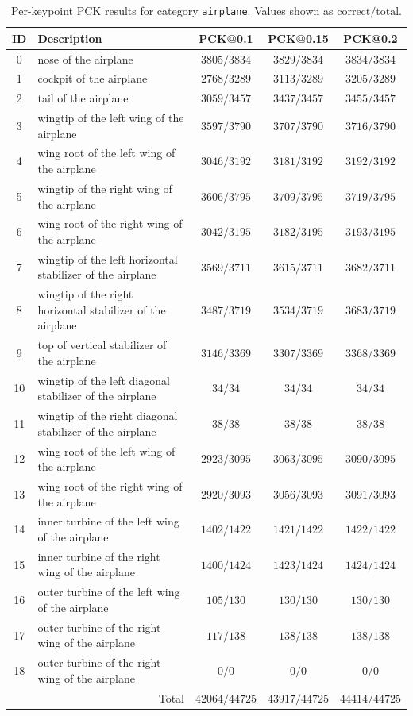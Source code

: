 \begin{table}[h]
\centering
\small
\caption{Per-keypoint PCK results for category \texttt{airplane}. Values shown as $\text{correct}/\text{total}$.}
\label{tab:pck_airplane}
\begin{tabular}{cl ccc}
\toprule
ID & Description & PCK@0.1 & PCK@0.15 & PCK@0.2 \\
\midrule
0 & nose of the airplane & $3805/3834$ & $3829/3834$ & $3834/3834$ \\
1 & cockpit of the airplane & $2768/3289$ & $3113/3289$ & $3205/3289$ \\
2 & tail of the airplane & $3059/3457$ & $3437/3457$ & $3455/3457$ \\
3 & wingtip of the left wing of the airplane & $3597/3790$ & $3707/3790$ & $3716/3790$ \\
4 & wing root of the left wing of the airplane & $3046/3192$ & $3181/3192$ & $3192/3192$ \\
5 & wingtip of the right wing of the airplane & $3606/3795$ & $3709/3795$ & $3719/3795$ \\
6 & wing root of the right wing of the airplane & $3042/3195$ & $3182/3195$ & $3193/3195$ \\
7 & wingtip of the left horizontal stabilizer of the airplane & $3569/3711$ & $3615/3711$ & $3682/3711$ \\
8 & wingtip of the right horizontal stabilizer of the airplane & $3487/3719$ & $3534/3719$ & $3683/3719$ \\
9 & top of vertical stabilizer of the airplane & $3146/3369$ & $3307/3369$ & $3368/3369$ \\
10 & wingtip of the left diagonal stabilizer of the airplane & $34/34$ & $34/34$ & $34/34$ \\
11 & wingtip of the right diagonal stabilizer of the airplane & $38/38$ & $38/38$ & $38/38$ \\
12 & wing root of the left wing of the airplane & $2923/3095$ & $3063/3095$ & $3090/3095$ \\
13 & wing root of the right wing of the airplane & $2920/3093$ & $3056/3093$ & $3091/3093$ \\
14 & inner turbine of the left wing of the airplane & $1402/1422$ & $1421/1422$ & $1422/1422$ \\
15 & inner turbine of the right wing of the airplane & $1400/1424$ & $1423/1424$ & $1424/1424$ \\
16 & outer turbine of the left wing of the airplane & $105/130$ & $130/130$ & $130/130$ \\
17 & outer turbine of the right wing of the airplane & $117/138$ & $138/138$ & $138/138$ \\
18 & outer turbine of the right wing of the airplane & $0/0$ & $0/0$ & $0/0$ \\
\midrule
\multicolumn{2}{r}{Total} & $42064/44725$ & $43917/44725$ & $44414/44725$ \\
\bottomrule
\end{tabular}
\end{table}

